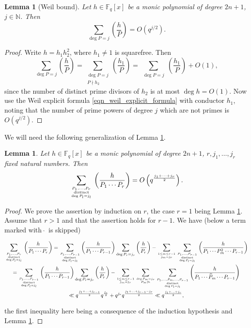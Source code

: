 \documentclass[alphabetic, 
        colorlinks,
        linkcolor=red,  citecolor=blue,
        backref
]{amsart}
\numberwithin{equation}{section}
\newtheorem{lem}[claim]{Lemma}
\theoremstyle{definition}
\newcommand{\N}{{\mathbb N}}
\newcommand{\F}{\mathbb{F}}
\begin{document}
\begin{lem}[Weil bound]\label{prop_weil_bound}
    Let $h\in\F_q[x]$ be a monic polynomial of degree $2n+1$, $j\in\N$. Then
    $$
    \sum_{\deg P=j}\left(\frac{h}{P}\right)=O(q^{j/2}).
    $$
\end{lem}

\begin{proof}
Write $h=h_1h_2^2$, where $h_1\neq 1$ is squarefree. Then 
$$
    \sum_{\deg P=j}\left(\frac{h}{P}\right)=
    \sum_{\substack{\deg P=j\\ P\nmid h_2}}\left(\frac{h_1}{P}\right)=\sum_{\substack{\deg P=j}}\left(\frac{h_1}{P}\right)+O(1),
$$
since the number of distinct prime divisors of $h_2$ is at most $\deg h=O(1)$. Now use the Weil explicit formula \eqref{eqn_weil_explicit_formula} with conductor $h_1$, noting that the number of prime powers of degree $j$ which are not primes is $O(q^{j/2})$. 
\end{proof}

We will need the following generalization of Lemma \ref{prop_weil_bound}.

\begin{lem}\label{lem: weil gen} Let $h\in\F_q[x]$ be a monic polynomial of degree $2n+1$, $r,j_1,\ldots,j_r$ fixed natural numbers. Then
$$\sum_{P_1,\ldots,P_r\atop{\mathrm{distinct}\atop{\deg P_l=j_l}}}\left(\frac h{P_1\cdots P_r}\right)=O\left(q^{\frac{j_1+\cdots+j_r}2}\right).$$
\end{lem}

\begin{proof}
We prove the assertion by induction on $r$, the case $r=1$ being Lemma \ref{prop_weil_bound}. Assume that $r>1$ and that the assertion holds for $r-1$. We have (below a term marked with  $\,\widehat{}\,$ is skipped)

\begin{samepage}
\begin{multline*}\sum_{P_1,\ldots,P_r\atop{\text{distinct}\atop{\deg P_l=j_l}}}\left(\frac h{P_1\cdots P_r}\right)=\sum_{P_1,\ldots,P_{r-1}\atop{\text{distinct}\atop{\deg P_l=j_l}}}\left(\frac h{P_1\cdots P_{r-1}}\right)\sum_{\deg P_r=j_r}\left(\frac h{P_r}\right)-\sum_{1\le m\le r-1\atop{j_m=j_r}}\sum_{P_1,\ldots,P_{r-1}\atop{\text{distinct}\atop{\deg P_l=j_l}}}\left(\frac h{P_1\cdots P_m^2\cdots P_{r-1}}\right)
\\=
\sum_{P_1,\ldots,P_{r-1}\atop{\text{distinct}\atop{\deg P_l=j_l}}}\left(\frac h{P_1\cdots P_{r-1}}\right)\sum_{\deg P_r=j_r}\left(\frac h{P_r}\right)-\sum_{1\le m\le r-1\atop{j_m=j_r}}\sum_{\deg P_m=j_r\atop{P_m\nmid h}}\sum_{P_1,\ldots,\hat{P}_m,\ldots,P_{r-1}\atop{\text{distinct}\atop{\deg P_l=j_l}}}\left(\frac h{P_1\cdots \widehat{P}_m\cdots P_{r-1}}\right)
\\
\ll q^{\frac{j_1+\ldots+ j_{r-1}}2}q^{\frac {j_r}2}+q^{j_r}q^{\frac{j_1+\ldots+j_{r-1}-j_r}2}\ll q^{\frac{j_1+\ldots+j_r}2},
\end{multline*}
\end{samepage}
the first inequality here being a consequence of the induction hypothesis and Lemma \ref{prop_weil_bound}.\end{proof}
\end{document}
